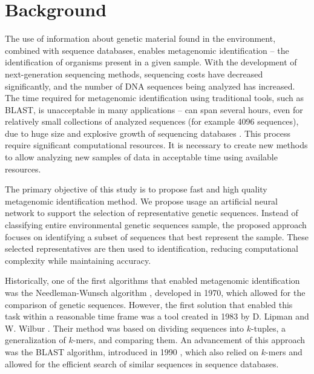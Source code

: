 \documentclass[pdflatex,sn-vancouver-num]{sn-jnl}%
\begin{document}


    \maketitle


    \section{Background}
    The use of information about genetic material found in the environment, combined with sequence databases, enables metagenomic identification -- the identification of organisms present in a given sample.
    With the development of next-generation sequencing methods\cite{Reinartz:2002}, sequencing costs have decreased significantly, and the number of DNA sequences being analyzed has increased\cite{Muir:2016}.
    The time required for metagenomic identification using traditional tools, such as BLAST, is unacceptable in many applications -- can span several hours, even for relatively small collections of analyzed sequences (for example 4096 sequences),
    due to huge size and explosive growth of sequencing databases \cite{10.1093/nar/gkr854}.
    This process require significant computational resources. It is necessary to create new methods to allow analyzing new samples of data in acceptable time using available resources.

    The primary objective of this study is to propose fast and high quality metagenomic identification method. We propose usage an artificial neural network to support the selection of representative genetic sequences.
    Instead of classifying entire environmental genetic sequences sample, the proposed approach focuses on identifying a subset of sequences that best represent the sample.
    These selected representatives are then used to identification, reducing computational complexity while maintaining accuracy.

    Historically, one of the first algorithms that enabled metagenomic identification was the Needleman-Wunsch algorithm \cite{Needleman:1970}, developed in 1970, which allowed for the comparison of genetic sequences.
    However, the first solution that enabled this task within a reasonable time frame was a tool created in 1983 by D. Lipman and W. Wilbur \cite{Wilbur:1983}.
    Their method was based on dividing sequences into $k$-tuples, a generalization of $k$-mers, and comparing them.
    An advancement of this approach was the BLAST algorithm, introduced in 1990 \cite{Altschul:1990}, which also relied on $k$-mers and allowed for the efficient search of similar sequences in sequence databases.
\end{document}
